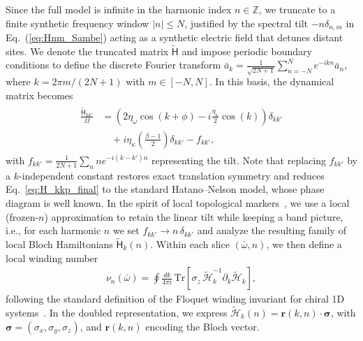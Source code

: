 \documentclass[a4paper,twocolumn,floatfix,10pt,superscriptaddress]%
{quantumarticle}
\newcommand{\msf}[1]{\mathsf{#1}}
\newcommand{\mcl}[1]{\mathcal{#1}}
\newcommand{\bsb}[1]{\boldsymbol{#1}}
\newcommand{\bomega}{{\bar{\omega}}}
\newcommand{\mcH}{{\mcl{H}}}
\newcommand{\msH}{{\msf{H}}}
\begin{document}
Since the full model is infinite in the harmonic index $n \in \mathbb{Z}$, we truncate to a finite synthetic frequency window $|n| \leq N$, justified by the spectral tilt $-n\delta_{n,m}$ in Eq.~(\ref{eq:Hnm_Sambe}) acting as a synthetic electric field that detunes distant sites. We denote the truncated matrix $\tilde{\msH}$ and impose periodic boundary conditions to define the discrete Fourier transform $\bar{a}_k = \frac{1}{\sqrt{2N+1}} \sum_{n=-N}^N e^{-i k n} \bar{a}_n$, 
where $k = 2\pi m/(2N+1)$ with $m \in [-N,N]$. In this basis, the dynamical matrix becomes
\begin{align}\label{eq:H_kkp_final}
\begin{aligned}
\frac{\tilde{\msH}_{k k'}}{\Omega} &= 
\left( 2 \eta_\omega \cos(k + \phi) 
- i \frac{\eta_\kappa}{2} \cos(k) \right) \delta_{kk'} \\
&\quad + i\eta_\kappa\left( \frac{\beta-1}{2} \right)\delta_{kk'} - f_{kk'},
\end{aligned}
\end{align}
with $f_{kk'} = \frac{1}{2N+1} \sum_n n e^{-i(k - k')n}$ representing the tilt. Note that replacing $f_{kk'}$ by a $k$-independent constant restores exact translation symmetry and reduces Eq.~\eqref{eq:H_kkp_final} to the standard Hatano–Nelson model, whose phase diagram is well known. In the spirit of local topological markers~\cite{BiancoResta2011}, we use a local (frozen-$n$) approximation to retain the linear tilt while keeping a band picture, i.e., for each harmonic $n$ we set $f_{kk'} \to n\,\delta_{kk'}$ and analyze the resulting family of local Bloch Hamiltonians $\tilde{\msH}_{k}(n)$. Within each slice $(\bomega,n)$, we then define a local winding number
\begin{align}
\label{eq:winding_number_Hbar}
\nu_n(\bomega)
=\oint \frac{dk}{4\pi i}\, \mathrm{Tr}\!\left[\sigma_z\, \tilde{\mcH}_k^{-1}\partial_k \tilde{\mcH}_k\right],
\end{align}
following the standard definition of the Floquet winding invariant for chiral 1D systems~\cite{Kitagawa2010}. In the doubled representation, we express $\tilde{\mcH}_k(n)=\bsb{r}(k,n)\cdot\bsb{\sigma}$, with $\bsb{\sigma}=(\sigma_x,\sigma_y,\sigma_z)$, and $\bsb{r}(k,n)$ encoding the Bloch vector. 
\end{document}
